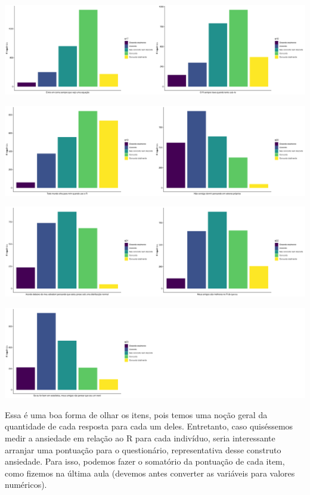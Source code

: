 \documentclass[
  letterpaper,
  DIV=11,
  numbers=noendperiod]{scrartcl}
\begin{document}
\includegraphics{descritiva_files/figure-pdf/unnamed-chunk-26-9.pdf}

\includegraphics{descritiva_files/figure-pdf/unnamed-chunk-26-10.pdf}

\includegraphics{descritiva_files/figure-pdf/unnamed-chunk-26-11.pdf}

\includegraphics{descritiva_files/figure-pdf/unnamed-chunk-26-12.pdf}

Essa é uma boa forma de olhar os itens, pois temos uma noção geral da
quantidade de cada resposta para cada um deles. Entretanto, caso
quiséssemos medir a ansiedade em relação ao R para cada indivíduo, seria
interessante arranjar uma pontuação para o questionário, representativa
desse construto ansiedade. Para isso, podemos fazer o somatório da
pontuação de cada item, como fizemos na última aula (devemos antes
converter as variáveis para valores numéricos).
\end{document}

